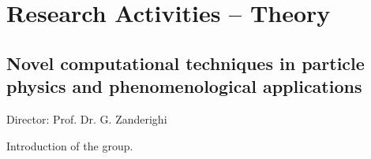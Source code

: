 \documentclass{FBR_Bericht_2025}
\begin{document}
\onecolumn
{}
\tableofcontents
\cleardoublepage

\twocolumn

\chapter{Research Activities -- Theory}
\section[Phenomenology]{Novel computational techniques in particle physics and phenomenological applications}
\begin{Namen}
Director: Prof. Dr. G. Zanderighi
\end{Namen}
Introduction of the group.

\end{document}
